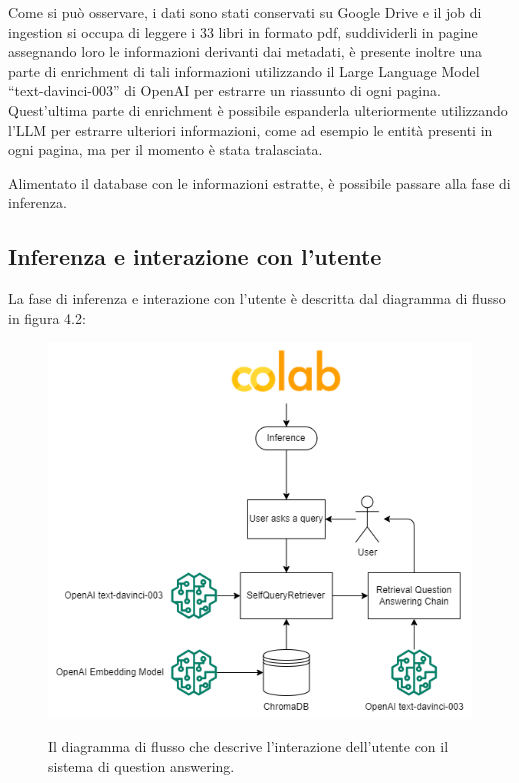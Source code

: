 Come si può osservare, i dati sono stati conservati su Google Drive e il job di ingestion si occupa di leggere i 33 libri in formato pdf,
suddividerli in pagine assegnando loro le informazioni derivanti dai metadati, è presente inoltre una parte di enrichment di tali informazioni 
utilizzando il Large Language Model ``text-davinci-003'' di OpenAI per estrarre un riassunto di ogni pagina. Quest'ultima parte di enrichment è possibile espanderla ulteriormente
utilizzando l'LLM per estrarre ulteriori informazioni, come ad esempio le entità presenti in ogni pagina, ma per il momento è stata tralasciata.

Alimentato il database con le informazioni estratte, è possibile passare alla fase di inferenza.

\subsection[Inferenza]{Inferenza e interazione con l'utente}

La fase di inferenza e interazione con l'utente è descritta dal diagramma di flusso in figura 4.2:

\begin{figure}[H]
    \centering
    \includegraphics[height=0.3\pdfpageheight]{images/Inference.png}\label{fig:infer}
    \caption[Ingestion]{Il diagramma di flusso che descrive l'interazione dell'utente con il sistema di question answering.}
\end{figure}

\lipsum[1-4]